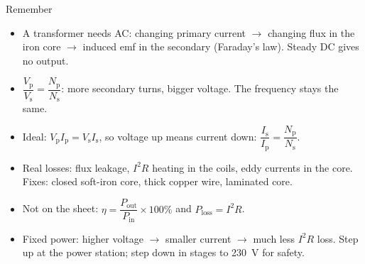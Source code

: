 \begin{summarybox}{Remember}
\begin{itemize}
  \item A transformer needs AC: changing primary current $\to$ changing flux in the iron
        core $\to$ induced emf in the secondary (Faraday's law). Steady DC gives no output.
  \item $\dfrac{V_\mathrm{p}}{V_\mathrm{s}} = \dfrac{N_\mathrm{p}}{N_\mathrm{s}}$: more
        secondary turns, bigger voltage. The frequency stays the same.
  \item Ideal: $V_\mathrm{p}I_\mathrm{p} = V_\mathrm{s}I_\mathrm{s}$, so voltage up means
        current down: $\dfrac{I_\mathrm{s}}{I_\mathrm{p}} = \dfrac{N_\mathrm{p}}{N_\mathrm{s}}$.
  \item Real losses: flux leakage, $I^2R$ heating in the coils, eddy currents in the core.
        Fixes: closed soft-iron core, thick copper wire, laminated core.
  \item Not on the sheet: $\eta = \dfrac{P_\mathrm{out}}{P_\mathrm{in}} \times 100\%$ and
        $P_\mathrm{loss} = I^2R$.
  \item Fixed power: higher voltage $\to$ smaller current $\to$ much less $I^2R$ loss.
        Step up at the power station; step down in stages to \qty{230}{V} for safety.
\end{itemize}
\end{summarybox}
